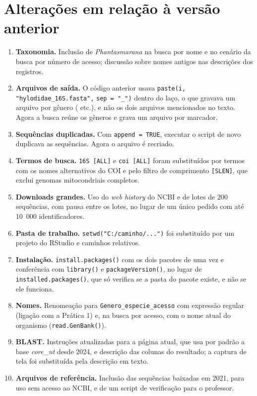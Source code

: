 \documentclass[11pt,a4paper]{article}
\newcommand{\arq}[1]{\path{#1}}
\begin{document}
\section{Alterações em relação à versão anterior}\label{ap:mudancas}

\begin{enumerate}
\item \textbf{Taxonomia.} Inclusão de \emph{Phantasmarana} \cite{vittorazzi2021,desa2022} na
busca por nome e no cenário da busca por número de acesso; discussão sobre nomes antigos nas
descrições dos registros.
\item \textbf{Arquivos de saída.} O código anterior usava \verb|paste(i, "hylodidae_16S.fasta",|
\verb|sep = "_")| dentro do laço, o que gravava um arquivo por gênero
(\arq{Hylodes_hylodidae_16S.fasta} etc.), e não os dois arquivos mencionados no texto. Agora a
busca reúne os gêneros e grava um arquivo por marcador.
\item \textbf{Sequências duplicadas.} Com \verb|append = TRUE|, executar o script de novo
duplicava as sequências. Agora o arquivo é recriado.
\item \textbf{Termos de busca.} \verb|16S [ALL]| e \verb|coi [ALL]| foram substituídos por
termos com os nomes alternativos do COI e pelo filtro de comprimento \verb|[SLEN]|, que exclui
genomas mitocondriais completos.
\item \textbf{Downloads grandes.} Uso do \emph{web history} do NCBI e de lotes de 200
sequências, com pausa entre os lotes, no lugar de um único pedido com até 10~000 identificadores.
\item \textbf{Pasta de trabalho.} \verb|setwd("C:/caminho/...")| foi substituído por um projeto
do RStudio e caminhos relativos.
\item \textbf{Instalação.} \verb|install.packages()| com os dois pacotes de uma vez e conferência
com \verb|library()| e \verb|packageVersion()|, no lugar de \verb|installed.packages()|, que só
verifica se a pasta do pacote existe, e não se ele funciona.
\item \textbf{Nomes.} Renomeação para \verb|Genero_especie_acesso| com expressão regular (ligação
com a Prática 1) e, na busca por acesso, com o nome atual do organismo
(\verb|read.GenBank()|).
\item \textbf{BLAST.} Instruções atualizadas para a página atual, que usa por padrão a base
\emph{core\_nt} desde 2024, e descrição das colunas do resultado; a captura de tela foi
substituída pela descrição em texto.
\item \textbf{Arquivos de referência.} Inclusão das sequências baixadas em 2021, para uso sem
acesso ao NCBI, e de um script de verificação para o professor.
\end{enumerate}
\end{document}
